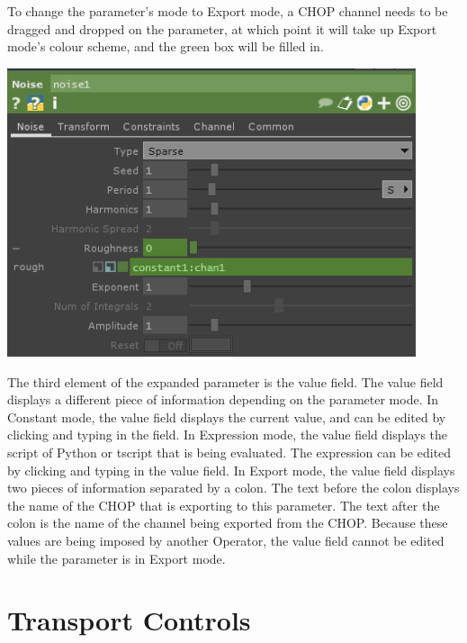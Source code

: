 \begin{fullwidth}
To change the parameter's mode to Export mode, a CHOP channel needs to be dragged and dropped on the parameter, at which point it will take up Export mode's colour scheme, and the green box will be filled in.

\begin{center}
\includegraphics[width=12cm]{./img/2.2/parameters-4.PNG}
\end{center}

The third element of the expanded parameter is the value field. The value field displays a different piece of information depending on the parameter mode. In Constant mode, the value field displays the current value, and can be edited by clicking and typing in the field. In Expression mode, the value field displays the script of Python or tscript that is being evaluated. The expression can be edited by clicking and typing in the value field. In Export mode, the value field displays two pieces of information separated by a colon. The text before the colon displays the name of the CHOP that is exporting to this parameter. The text after the colon is the name of the channel being exported from the CHOP. Because these values are being imposed by another Operator, the value field cannot be edited while the parameter is in Export mode.

\end{fullwidth}
\section{Transport Controls}

